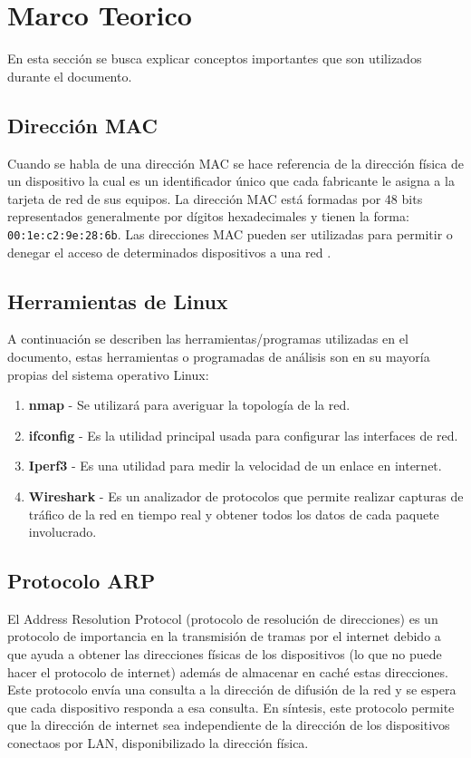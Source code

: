 \section{Marco Teorico}

\noindent En esta sección se busca explicar conceptos importantes que son utilizados durante el documento.

\subsection{Dirección MAC}

\noindent Cuando se habla de una dirección MAC se hace referencia de la dirección física de un dispositivo la cual es un identificador único que cada fabricante le asigna a la tarjeta de red de sus equipos. La dirección MAC está formadas por 48 bits representados generalmente por dígitos hexadecimales y tienen la forma: \verb|00:1e:c2:9e:28:6b|. Las direcciones MAC pueden ser utilizadas para permitir o denegar el acceso de determinados dispositivos a una red \cite{MAC}.


\subsection{Herramientas de Linux}

\noindent A continuación se describen las herramientas/programas utilizadas en el documento, estas herramientas o programadas de análisis son en su mayoría propias del sistema operativo Linux:

\begin{enumerate}
    \item \textbf{nmap} - Se utilizará para averiguar la topología de la red.
    \item \textbf{ifconfig} - Es la utilidad principal usada para configurar las interfaces de red.
    \item \textbf{Iperf3} - Es una utilidad para medir la velocidad de un enlace en internet.
    \item \textbf{Wireshark} - Es un analizador de protocolos que permite realizar capturas de tráfico de la red en tiempo real y obtener todos los datos de cada paquete involucrado.
\end{enumerate}


\subsection{Protocolo ARP}

\noindent El Address Resolution Protocol (protocolo de resolución de direcciones) es un protocolo de importancia en la transmisión de tramas por el internet debido a que ayuda a obtener las direcciones físicas de los dispositivos (lo que no puede hacer el protocolo de internet) además de almacenar en caché estas direcciones. Este protocolo envía una consulta a la dirección de difusión de la red y se espera que cada dispositivo responda a esa consulta. En síntesis, este protocolo permite que la dirección de internet sea independiente de la dirección de los dispositivos conectaos por LAN, disponibilizado la dirección física. 

